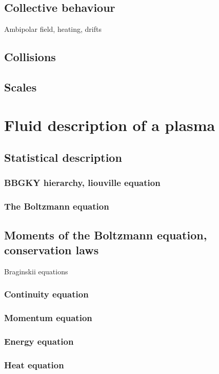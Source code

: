 		\subsection{Collective behaviour}
			Ambipolar field, heating, drifts
		\subsection{Collisions}
		\subsection{Scales}
		
	\section{Fluid description of a plasma}
		\subsection{Statistical description}
			\subsubsection{BBGKY hierarchy, liouville equation}
			\subsubsection{The Boltzmann equation}
		\subsection{Moments of the Boltzmann equation, conservation laws}
			Braginskii equations
			\subsubsection{Continuity equation}
			\subsubsection{Momentum equation}
			\subsubsection{Energy equation}
			\subsubsection{Heat equation}
